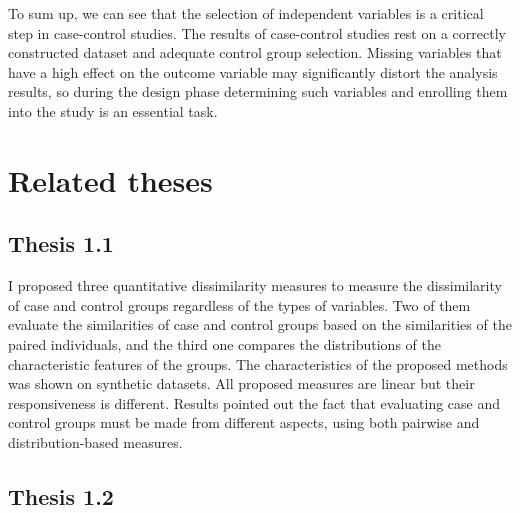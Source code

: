 		To sum up, we can see that the selection of independent variables is a critical step in case-control studies. The results of case-control studies rest on a correctly constructed dataset and adequate control group selection. Missing variables that have a high effect on the outcome variable may significantly distort the analysis results, so during the design phase determining such variables and enrolling them into the study is an essential task.
										
		\section{Related theses}
		\label{theses_first}
		         
		\subsection*{Thesis 1.1}
						
		I proposed three quantitative dissimilarity measures to measure the dissimilarity of case and control groups regardless of the types of variables. Two of them evaluate the similarities of case and control groups based on the similarities of the paired individuals, and the third one compares the distributions of the characteristic features of the groups. The characteristics of the proposed methods was shown on synthetic datasets. All proposed measures are linear but their responsiveness is different. Results pointed out the fact that evaluating case and control groups must be made from different aspects, using both pairwise and distribution-based measures. 
		
		        
						        
						        
		\subsection*{Thesis 1.2}
						        
